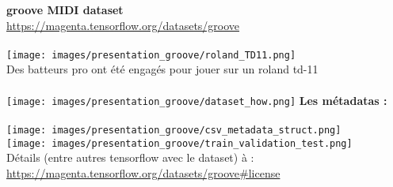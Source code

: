 \textbf{groove MIDI dataset}\\
	\url{https://magenta.tensorflow.org/datasets/groove}\\\\
	\texttt{[image: images/presentation\_groove/roland\_TD11.png]}\\
	Des batteurs pro ont été engagés pour jouer sur un roland td-11\\\\
	\texttt{[image: images/presentation\_groove/dataset\_how.png]}\newpage{}
	\textbf{Les métadatas :}\\\\
	\texttt{[image: images/presentation\_groove/csv\_metadata\_struct.png]}\\
	\texttt{[image: images/presentation\_groove/train\_validation\_test.png]}\\
	Détails (entre autres tensorflow avec le dataset) à :
	\url{https://magenta.tensorflow.org/datasets/groove#license}\\
	\newpage